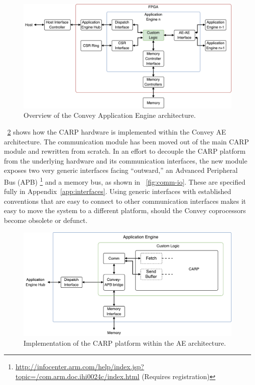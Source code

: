 \begin{figure}[ht]
  \centering
  \includegraphics[width=\linewidth]{fig/convey-ae-io-overview}
  \caption{Overview of the Convey Application Engine architecture.}
  \label{fig:convey-ae-io-overview}
\end{figure}

\figurename~\ref{fig:convey-io-carp-overivew} shows how the CARP hardware is
implemented within the Convey AE architecture. The communication module has been
moved out of the main CARP module and rewritten from scratch. In an effort to
decouple the CARP platform from the underlying hardware and its communication
interfaces, the new module exposes two very generic interfaces facing
``outward,'' an Advanced Peripheral Bus (APB)
\footnote{\url{http://infocenter.arm.com/help/index.jsp?topic=/com.arm.doc.ihi0024c/index.html}
(Requires registration)} and a memory bus, as shown in
\figurename~\ref{fig:comm-io}. These are specified fully in
Appendix~\ref{app:interfaces}. Using generic interfaces with established
conventions that are easy to connect to other communication interfaces makes it
easy to move the system to a different platform, should the Convey coprocessors
become obsolete or defunct.

\begin{figure}[ht]
  \centering
  \includegraphics[width=\linewidth]{fig/convey-io-carp-overview}
  \caption{Implementation of the CARP platform within the AE architecture.}
  \label{fig:convey-io-carp-overivew}
\end{figure}

